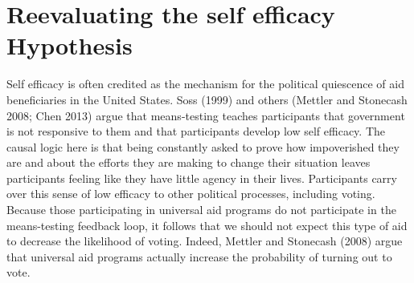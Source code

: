 \documentclass[12pt]{paper}
\begin{document}
\section{Reevaluating the self efficacy Hypothesis}
Self efficacy is often credited as the mechanism for the political quiescence of aid beneficiaries in the United States. Soss (1999) and others (Mettler and Stonecash 2008; Chen 2013) argue that means-testing teaches participants that government is not responsive to them and that participants develop low self efficacy. The causal logic here is that being constantly asked to prove how impoverished they are and about the efforts they are making to change their situation leaves participants feeling like they have little agency in their lives. Participants carry over this sense of low efficacy to other political processes, including voting. Because those participating in universal aid programs do not participate in the means-testing feedback loop, it follows that we should not expect this type of aid to decrease the likelihood of voting. Indeed, Mettler and Stonecash (2008) argue that universal aid programs actually increase the probability of turning out to vote.
\end{document}
